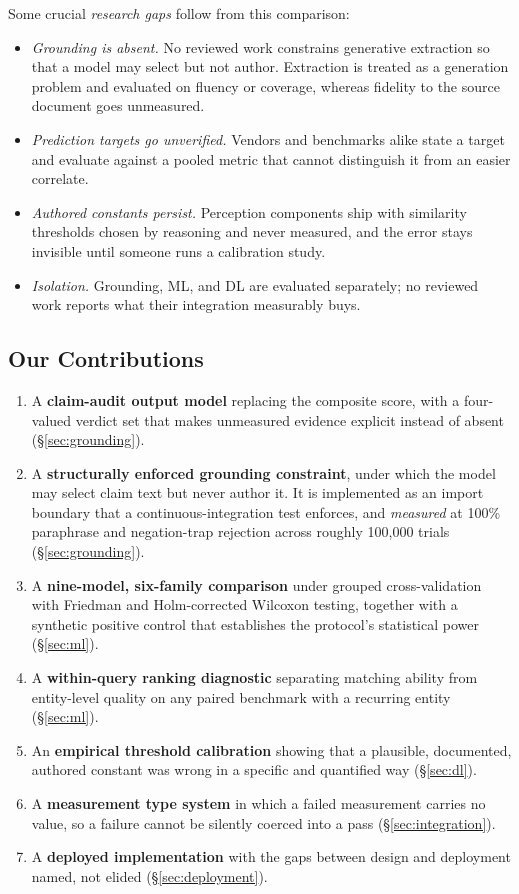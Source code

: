 \documentclass[manuscript,screen,review=false]{acmart}
\begin{document}
Some crucial \emph{research gaps} follow from this comparison:

\begin{itemize}
\item \emph{Grounding is absent.} No reviewed work constrains generative
      extraction so that a model may select but not author. Extraction is treated as a generation problem and evaluated on fluency or coverage, whereas fidelity to the source document goes unmeasured.
\item \emph{Prediction targets go unverified.} Vendors and benchmarks alike state
      a target and evaluate against a pooled metric that cannot distinguish it
      from an easier correlate.
\item \emph{Authored constants persist.} Perception components ship with similarity thresholds chosen by reasoning and never measured, and the error stays invisible until someone runs a calibration study.
\item \emph{Isolation.} Grounding, ML, and DL are evaluated separately; no
      reviewed work reports what their integration measurably buys.
\end{itemize}

\subsection{Our Contributions}

\begin{enumerate}
\item A \textbf{claim-audit output model} replacing the composite score, with a
      four-valued verdict set that makes unmeasured evidence explicit instead of absent (\S\ref{sec:grounding}).
\item A \textbf{structurally enforced grounding constraint}, under which the
      model may select claim text but never author it. It is implemented as an
      import boundary that a continuous-integration test enforces, and
      \emph{measured} at 100\% paraphrase and negation-trap rejection across
      roughly 100{,}000 trials (\S\ref{sec:grounding}).
\item A \textbf{nine-model, six-family comparison} under grouped cross-validation
      with Friedman and Holm-corrected Wilcoxon testing, together with a
      synthetic positive control that establishes the protocol's statistical
      power (\S\ref{sec:ml}).
\item A \textbf{within-query ranking diagnostic} separating matching ability from
      entity-level quality on any paired benchmark with a recurring entity
      (\S\ref{sec:ml}).
\item An \textbf{empirical threshold calibration} showing that a plausible,
      documented, authored constant was wrong in a specific and quantified way
      (\S\ref{sec:dl}).
\item A \textbf{measurement type system} in which a failed measurement carries no
      value, so a failure cannot be silently coerced into a pass
      (\S\ref{sec:integration}).
\item A \textbf{deployed implementation} with the gaps between design and deployment named, not elided (\S\ref{sec:deployment}).
\end{enumerate}
\end{document}
